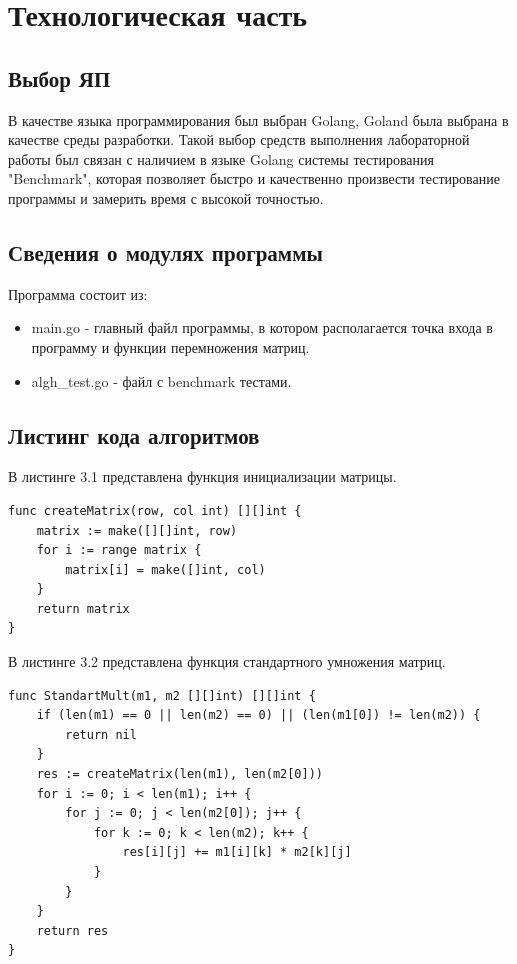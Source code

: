 \documentclass[12pt]{report}
\begin{document}
\chapter{Технологическая часть}
\section{Выбор ЯП}
В качестве языка программирования был выбран Golang, Goland была выбрана в качестве среды разработки. \cite{Golang} \cite{Goland}
Такой выбор средств выполнения лабораторной работы был связан с наличием в языке Golang системы тестирования "Benchmark", которая позволяет быстро и качественно произвести тестирование программы и замерить время с высокой точностью.


\section{Сведения о модулях программы}
Программа состоит из:
\begin{itemize}
	\item main.go - главный файл программы, в котором располагается точка входа в программу и функции перемножения матриц.
	\item algh_test.go - файл с benchmark тестами.
\end{itemize}


\section{Листинг кода алгоритмов}

В листинге 3.1 представлена функция инициализации матрицы.
\begin{lstlisting}[label=CodeStand,caption= Инициализация матрицы]
func createMatrix(row, col int) [][]int {
	matrix := make([][]int, row)
	for i := range matrix {
		matrix[i] = make([]int, col)
	}
	return matrix
}

\end{lstlisting}

В листинге 3.2 представлена функция стандартного умножения матриц.
\newline
\begin{lstlisting}[label=CodeStand,caption= Стандартный алгоритм умножения матриц]
func StandartMult(m1, m2 [][]int) [][]int {
	if (len(m1) == 0 || len(m2) == 0) || (len(m1[0]) != len(m2)) {
		return nil
	}
	res := createMatrix(len(m1), len(m2[0]))
	for i := 0; i < len(m1); i++ {
		for j := 0; j < len(m2[0]); j++ {
			for k := 0; k < len(m2); k++ {
				res[i][j] += m1[i][k] * m2[k][j]
			}
		}
	}
	return res
}
\end{lstlisting}
\end{document}
